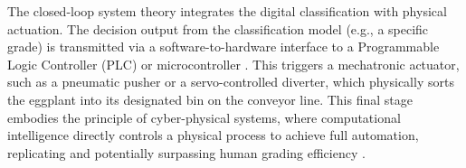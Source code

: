 {The closed-loop system theory integrates the digital classification with physical actuation. The decision output from the classification model (e.g., a specific grade) is transmitted via a software-to-hardware interface to a Programmable Logic Controller (PLC) or microcontroller \citep{bolton2015programmable}. This triggers a mechatronic actuator, such as a pneumatic pusher or a servo-controlled diverter, which physically sorts the eggplant into its designated bin on the conveyor line. This final stage embodies the principle of cyber-physical systems, where computational intelligence directly controls a physical process to achieve full automation, replicating and potentially surpassing human grading efficiency \citep{lee2008cyber,zhang2022advancements}.

}
